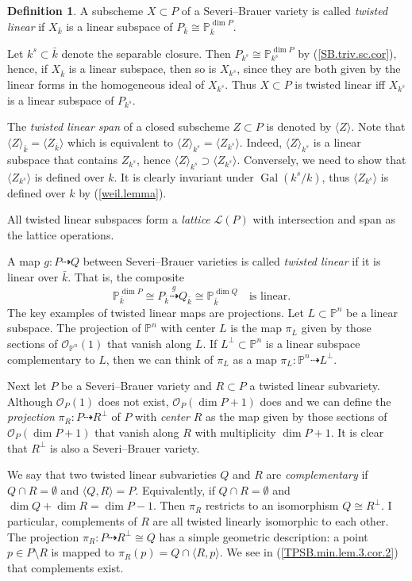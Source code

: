 \documentclass{amsart}
\theoremstyle{definition}
\newtheorem{defn}[thm]{Definition}
\theoremstyle{remark}
\renewcommand{\o}[0]{{\mathcal O}}
\newcommand{\p}[0]{{\mathbb P}}
\newcommand{\map}[0]{\dasharrow}
\newcommand{\qtq}[1]{\quad\mbox{#1}\quad}
\newcommand{\gal}[0]{\operatorname{Gal}}
\begin{document}
\begin{defn} \label{tw.lin.sub.defn}
A subscheme $X\subset P$ of a 
Severi--Brauer variety is called {\it twisted linear} if
$X_{\bar k}$ is a linear subspace of $P_{\bar k}\cong \p^{\dim P}_{\bar k}$.

Let $k^s\subset \bar k$ denote the separable closure. Then 
$P_{k^s}\cong \p^{\dim P}_{k^s}$ by  (\ref{SB.triv.sc.cor}),
hence, if  $X_{\bar k}$ is a linear subspace, then so is
$X_{k^s}$,  since they are both given by the linear forms in the homogeneous ideal of $X_{k^s}$. Thus 
 $X\subset P$ is  twisted linear iff
$X_{k^s}$ is a linear subspace of $P_{k^s}$.

The {\it  twisted linear span} of a closed subscheme  $Z\subset P$
is denoted by  $\langle Z\rangle$. Note that 
$\langle Z\rangle_{\bar k}=\langle Z_{\bar k}\rangle$
which is equivalent to  $\langle Z\rangle_{k^s}=\langle Z_{k^s}\rangle$.
Indeed, $\langle Z\rangle_{k^s}$ is a linear subspace that contains
$Z_{k^s}$, hence $\langle Z\rangle_{k^s}\supset \langle Z_{k^s}\rangle$.
Conversely, we need to show that $ \langle Z_{k^s}\rangle$ is
defined over $k$. It is clearly invariant under $\gal(k^s/k)$, 
thus 
$ \langle Z_{k^s}\rangle$ is defined over $k$ by 
(\ref{weil.lemma}). 

All twisted linear subspaces form a {\it lattice}  
${\mathcal L}(P)$ with intersection and span as the lattice operations.


A map $g:P\map Q$ between Severi--Brauer varieties is called {\it twisted linear} if  it is linear over $\bar k$. That is, the composite
$$
\p_{\bar k}^{\dim P}\cong P_{\bar k}\stackrel{g}{\map}
 Q_{\bar k}\cong \p_{\bar k}^{\dim Q}
\qtq{is linear.}
$$
The key examples of twisted linear maps are projections.
Let $L\subset \p^n$ be a linear subspace. The projection of $\p^n$ 
with center $L$ is the map $\pi_L$ given by  
those sections of $\o_{\p^n}(1)$ that vanish along $L$. 
If $L^{\perp}\subset \p^n$ is a linear subspace complementary to $L$,
then we can think of $\pi_L$ as a map 
$\pi_L:\p^n\map L^{\perp}$. 

Next let  $P$ be a Severi--Brauer variety and
$R\subset P$ a twisted linear subvariety. Although 
$\o_{P}(1)$ does not exist, $\o_{P}(\dim P+1)$ does and
we can define the  {\it projection} 
$\pi_R:P\map R^{\perp}$ of $P$ with {\it center} $R$ as the map 
given by  
those sections of $\o_{P}(\dim P+1)$ that vanish along $R$ with multiplicity $\dim P+1$. It is clear that $R^{\perp}$ is also a Severi--Brauer variety.


We say that two twisted linear subvarieties $Q$ and $ R$
are {\it complementary} if $Q\cap R=\emptyset$ and  
 $\langle Q, R\rangle=P$. Equivalently, if $Q\cap R=\emptyset$ and  
$\dim Q+\dim R=\dim P-1$. 
Then $\pi_R$ restricts to an isomorphism  $Q\cong R^{\perp}$. I particular,
complements of $R$ are all twisted linearly isomorphic to each other.
The projection  $\pi_R:P\map R^{\perp}\cong Q$  has a simple   geometric description: 
 a point $p\in P\setminus R$ is mapped to 
 $\pi_R(p)=Q\cap \langle R, p\rangle$. 
We see in (\ref{TPSB.min.lem.3.cor.2})  that complements exist.
\end{defn}
\end{document}

